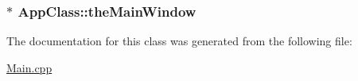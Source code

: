 \hypertarget{class_app_class_0ff1f432b52ab3f4121b6b6fe5b13e5a}{
\subsubsection[{theMainWindow}]{$\ast$ {\bf AppClass::theMainWindow}}}
\label{class_app_class_0ff1f432b52ab3f4121b6b6fe5b13e5a}




The documentation for this class was generated from the following file:\begin{CompactItemize}
\item 
\hyperlink{_main_8cpp}{Main.cpp}\end{CompactItemize}
